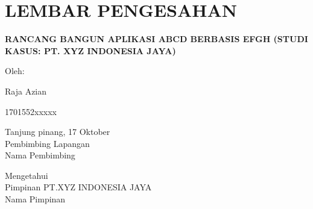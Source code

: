 %
%
%

\chapter*{\centering LEMBAR PENGESAHAN}

\thispagestyle{empty}


\begin{center}
    \textbf{RANCANG BANGUN APLIKASI ABCD BERBASIS EFGH (STUDI KASUS: PT. XYZ INDONESIA JAYA)}
\end{center}

\vspace{1cm}

\begin{center}
    Oleh:
    \begin{multicols}{2}
        {Raja Azian}

        {1701552xxxxx}
    \end{multicols}

    \vspace{1cm}

    Tanjung pinang, 17 Oktober \the\year{}\\
    Pembimbing Lapangan \\
    \vspace{2cm}
    Nama Pembimbing \\

    \vspace{2.75cm}

    Mengetahui\\
    Pimpinan PT.XYZ INDONESIA JAYA \\
    \vspace{2cm}
    Nama Pimpinan
\end{center}
\newpage
